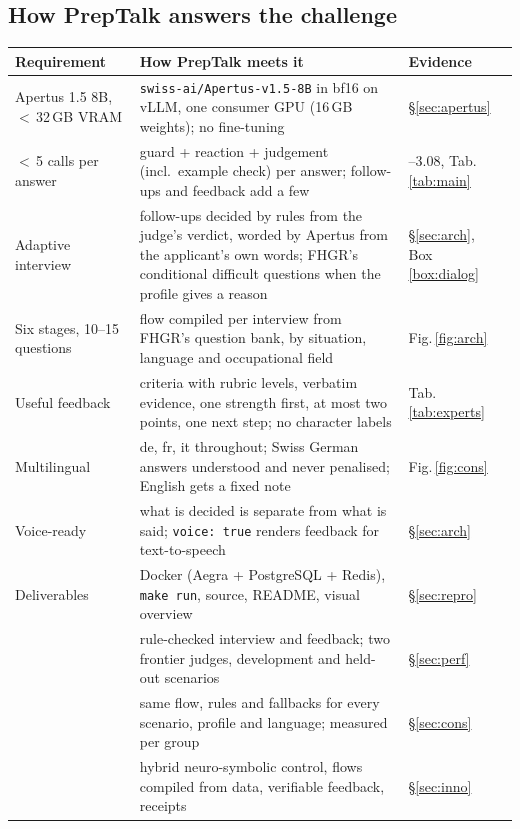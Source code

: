 \documentclass[10pt,a4paper]{article}
\newcommand{\callsDev}{3.06}
\newcommand{\callsHo}{3.08}
\newcommand{\crit}[2]{\tcbox[on line,colback=#1,colframe=#1,coltext=white,boxsep=0pt,left=3pt,right=3pt,top=1.5pt,bottom=1.5pt,arc=2pt,fontupper=\sffamily\bfseries\scriptsize]{#2}}
\newcommand{\perf}{\crit{steel}{Performance 50\,\%}}
\newcommand{\cons}{\crit{navy}{Consistency 25\,\%}}
\newcommand{\inno}{\crit{rust}{Innovation 25\,\%}}
\newcommand{\gate}{\crit{okgreen}{Required gate}}
\begin{document}
\subsection*{How PrepTalk answers the challenge}
\begin{center}\small
\begin{tabularx}{\textwidth}{@{}>{\raggedright\arraybackslash}p{3.3cm}>{\raggedright\arraybackslash}X>{\raggedright\arraybackslash}p{3.0cm}@{}}
\toprule
\sffamily\bfseries Requirement & \sffamily\bfseries How PrepTalk meets it & \sffamily\bfseries Evidence \\
\midrule
\gate{} Apertus 1.5 8B, $<$\,32\,GB VRAM & \texttt{swiss-ai/Apertus-v1.5-8B} in bf16 on vLLM, one consumer GPU (16\,GB weights); no fine-tuning & §\ref{sec:apertus} \\
\gate{} $<$\,5 calls per answer & guard + reaction + judgement (incl.\ example check) per answer; follow-ups and feedback add a few & \callsDev{}--\callsHo{}, Tab.\,\ref{tab:main} \\
Adaptive interview & follow-ups decided by rules from the judge's verdict, worded by Apertus from the applicant's own words; FHGR's conditional difficult questions when the profile gives a reason & §\ref{sec:arch}, Box\,\ref{box:dialog} \\
Six stages, 10--15 questions & flow compiled per interview from FHGR's question bank, by situation, language and occupational field & Fig.\,\ref{fig:arch} \\
Useful feedback & 11 criteria with rubric levels, verbatim evidence, one strength first, at most two points, one next step; no character labels & Tab.\,\ref{tab:experts} \\
Multilingual & de, fr, it throughout; Swiss German answers understood and never penalised; English gets a fixed note & Fig.\,\ref{fig:cons} \\
Voice-ready & what is decided is separate from what is said; \texttt{voice: true} renders feedback for text-to-speech & §\ref{sec:arch} \\
Deliverables & Docker (Aegra + PostgreSQL + Redis), \texttt{make run}, source, README, visual overview & §\ref{sec:repro} \\
\midrule
\perf{} & rule-checked interview and feedback; two frontier judges, development and held-out scenarios & §\ref{sec:perf} \\
\cons{} & same flow, rules and fallbacks for every scenario, profile and language; measured per group & §\ref{sec:cons} \\
\inno{} & hybrid neuro-symbolic control, flows compiled from data, verifiable feedback, receipts & §\ref{sec:inno} \\
\bottomrule
\end{tabularx}
\end{center}
\end{document}

